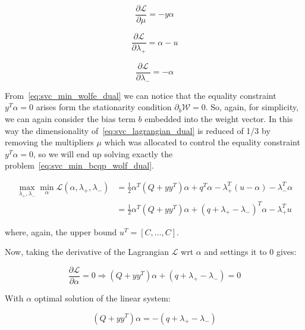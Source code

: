 \begin{equation} \label{eq:svc_lagrangian_der_mu}
	\frac{\partial \mathcal{L}}{\partial \mu}=-y \alpha
\end{equation}

\begin{equation} \label{eq:svc_lagrangian_der_lp}
	\frac{\partial \mathcal{L}}{\partial \lambda_+}=\alpha - u
\end{equation}

\begin{equation} \label{eq:svc_lagrangian_der_lm}
    \frac{\partial \mathcal{L}}{\partial \lambda_-}=-\alpha
\end{equation}

From~\eqref{eq:svc_min_wolfe_dual} we can notice that the equality constraint $y^T \alpha = 0$ arises form the stationarity condition $\partial_{{b}} \mathcal{W}=0$. So, again, for simplicity, we can again consider the bias term $b$ embedded into the weight vector. In this way the dimensionality of~\eqref{eq:svc_lagrangian_dual} is reduced of 1/3 by removing the multipliers $\mu$ which was allocated to control the equality constraint $y^T \alpha=0$, so we will end up solving exactly the problem~\eqref{eq:svc_min_bcqp_wolf_dual}.

\begin{equation} \label{eq:svc_bcqp_lagrangian_dual}
	\begin{aligned}
    	\max_{\lambda_+,\lambda_-} \min_{\alpha} \mathcal{L}(\alpha,\lambda_+,\lambda_-) &= \frac{1}{2} \alpha^T (Q + yy^T)\alpha+q^T\alpha - \lambda_+^T (u - \alpha) - \lambda_-^T \alpha \\
    &= \frac{1}{2} \alpha^T (Q + yy^T)\alpha + (q + \lambda_+ - \lambda_-)^T \alpha - \lambda_+^T u
	\end{aligned}
\end{equation}

where, again, the upper bound $u^T = [C, \dots, C]$.

Now, taking the derivative of the Lagrangian $\mathcal{L}$ wrt $\alpha$ and settings it to 0 gives:

\begin{equation} \label{eq:svc_bcqp_lagrangian_der_a}
	\frac{\partial \mathcal{L}}{\partial \alpha}=0\Rightarrow (Q + yy^T) \alpha + (q + \lambda_+ - \lambda_-) = 0
\end{equation}

With $\alpha$ optimal solution of the linear system:

\begin{equation} \label{eq:svc_bcqp_lagrangian_sol}
    (Q + yy^T) \alpha = - (q + \lambda_+ - \lambda_-)
\end{equation}

